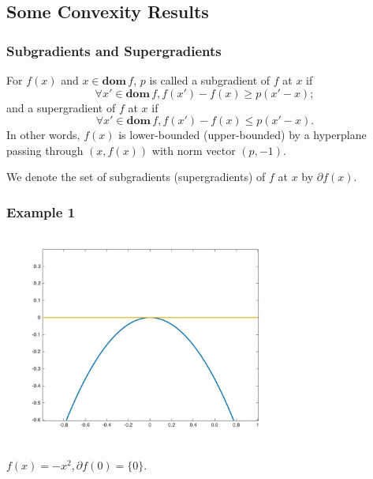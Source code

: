 \documentclass{beamer}
\begin{document}
\subsection{Some Convexity Results}
\begin{frame}
    \frametitle{Subgradients and Supergradients}
    For $f(x)$ and $x\in \mathbf{dom}\,f$, $p$ is called a subgradient of $f$ at $x$ if
    \begin{equation}
        \forall x'\in \mathbf{dom}\,f,f(x')-f(x)\ge p(x'-x);
    \end{equation}
    and a supergradient of $f$ at $x$ if
    \begin{equation}
        \forall x'\in \mathbf{dom}\,f,f(x')-f(x)\le p(x'-x).
    \end{equation}
    In other words, $f(x)$ is lower-bounded (upper-bounded) by a hyperplane passing through $(x,f(x))$ with norm vector $(p,-1)$.

    We denote the set of subgradients (supergradients) of $f$ at $x$ by $\partial f(x)$.
\end{frame}

\begin{frame}
    \frametitle{Example 1}
    \begin{center}
        \includegraphics[width=0.7\textwidth]{subgrad1.jpg}
    \end{center}
    \begin{center}
        $f(x)=-x^2,\partial f(0)=\{0\}$.
    \end{center}
\end{frame}
\end{document}
